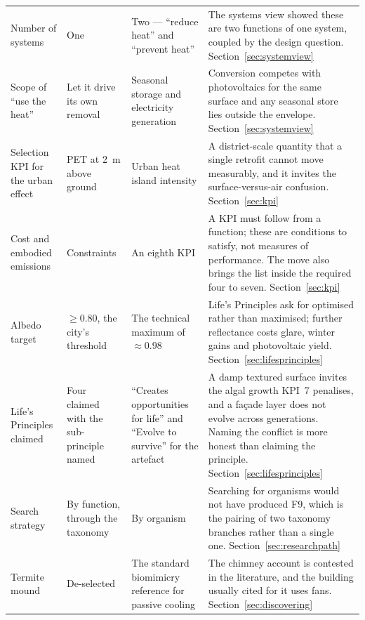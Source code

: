 \begin{longtable}{L{2.6cm} L{3.0cm} L{3.0cm} L{5.7cm}}
Number of systems & One & Two --- \enquote{reduce heat} and \enquote{prevent heat} & The systems view showed these are two functions of one system, coupled by the design question. Section~\ref{sec:systemview} \\

Scope of \enquote{use the heat} & Let it drive its own removal & Seasonal storage and electricity generation & Conversion competes with photovoltaics for the same surface and any seasonal store lies outside the envelope. Section~\ref{sec:systemview} \\

Selection KPI for the urban effect & PET at \qty{2}{\metre} above ground & Urban heat island intensity & A district-scale quantity that a single retrofit cannot move measurably, and it invites the surface-versus-air confusion. Section~\ref{sec:kpi} \\

Cost and embodied emissions & Constraints & An eighth KPI & A KPI must follow from a function; these are conditions to satisfy, not measures of performance. The move also brings the list inside the required four to seven. Section~\ref{sec:kpi} \\

Albedo target & $\geq0.80$, the city's threshold & The technical maximum of $\approx0.98$ & Life's Principles ask for optimised rather than maximised; further reflectance costs glare, winter gains and photovoltaic yield. Section~\ref{sec:lifesprinciples} \\

Life's Principles claimed & Four claimed with the sub-principle named & \enquote{Creates opportunities for life} and \enquote{Evolve to survive} for the artefact & A damp textured surface invites the algal growth KPI~7 penalises, and a façade layer does not evolve across generations. Naming the conflict is more honest than claiming the principle. Section~\ref{sec:lifesprinciples} \\

Search strategy & By function, through the taxonomy & By organism & Searching for organisms would not have produced F9, which is the pairing of two taxonomy branches rather than a single one. Section~\ref{sec:researchpath} \\

Termite mound & De-selected & The standard biomimicry reference for passive cooling & The chimney account is contested in the literature, and the building usually cited for it uses fans. Section~\ref{sec:discovering} \\


\end{longtable}
